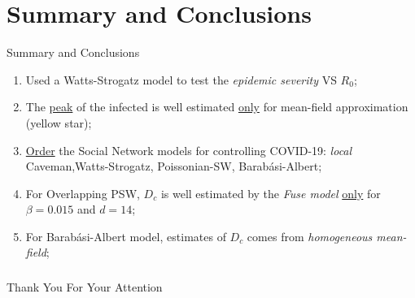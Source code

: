\documentclass[xcolor={dvipsnames}]{beamer}
\begin{document}
\section{Summary and Conclusions}
\begin{frame}{Summary and Conclusions}
\centering
\begin{enumerate}
	\item Used a Watts-Strogatz model to test the \textit{epidemic severity} VS $ R_0$; 
	\item The \underline{peak} of the infected is well estimated \underline{only} for mean-field approximation (yellow star); 
	\item \underline{Order} the Social Network models for controlling COVID-19: \textit{local} Caveman,Watts-Strogatz, Poissonian-SW, Barabási-Albert; \\
	\item For Overlapping PSW, $ D_c$ is well estimated by the \textit{Fuse model} \underline{only} for $\beta = 0.015$ and $ d = 14$;
	\item For Barabási-Albert model, estimates of $ D_c$ comes from \textit{homogeneous mean-field};
\end{enumerate}
\end{frame}

\begin{frame}
	\frametitle{}
	\centering
	{\Huge Thank You For Your Attention}
\end{frame}
\end{document}
